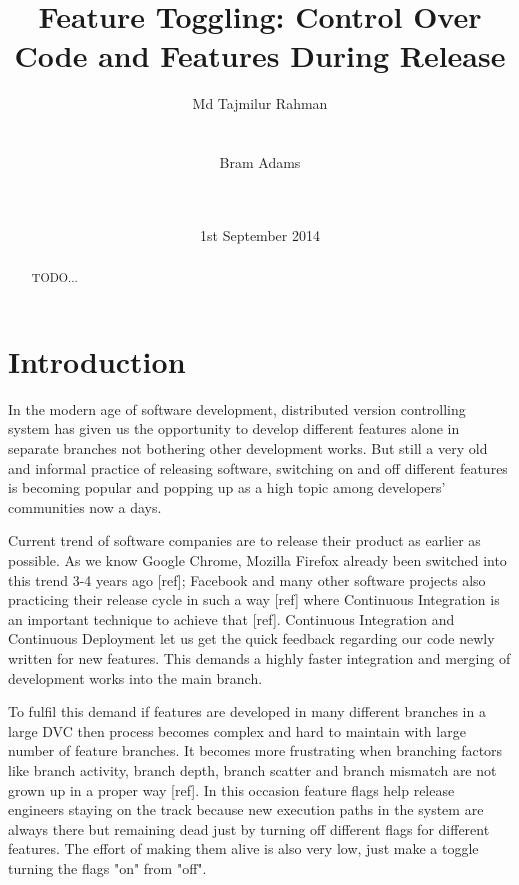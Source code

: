 \documentclass{acm_proc_article-sp}
\begin{document}
\title{Feature Toggling: Control Over Code and Features During Release}
\author{
\alignauthor
Md Tajmilur Rahman\\
       \\
       \\
\alignauthor
Bram Adams\\
       \\
       \\
}
\date{1st September 2014}
\maketitle

\begin{abstract}
TODO...
\end{abstract}

\section{Introduction}
In the modern age of software development, distributed version controlling system has given us the opportunity to develop different features alone in separate branches not bothering other development works. But still a very old and informal practice of releasing software, switching on and off different features is becoming popular and popping up as a high topic among developers' communities now a days.

Current trend of software companies are to release their product as earlier as possible. As we know Google Chrome, Mozilla Firefox already been switched into this trend 3-4 years ago [ref]; Facebook and many other software projects also practicing their release cycle in such a way [ref] where Continuous Integration is an important technique to achieve that [ref]. Continuous Integration and Continuous Deployment let us get the quick feedback regarding our code newly written for new features. This demands a highly faster integration and merging of development works into the main branch.

To fulfil this demand if features are developed in many different branches in a large DVC then process becomes complex and hard to maintain with large number of feature branches. It becomes more frustrating when branching factors like branch activity, branch depth, branch scatter and branch mismatch are not grown up in a proper way [ref]. In this occasion feature flags help release engineers staying on the track because new execution paths in the system are always there but remaining dead just by turning off different flags for different features. The effort of making them alive is also very low, just make a toggle turning the flags "on" from "off".
\end{document}

